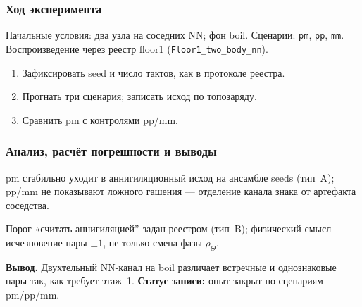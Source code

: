 \subsubsection*{Ход эксперимента}
Начальные условия: два узла на соседних NN; фон boil.
Сценарии: \texttt{pm}, \texttt{pp}, \texttt{mm}.
Воспроизведение через реестр floor1 (\texttt{Floor1\_two\_body\_nn}).

\begin{enumerate}[label=\textbf{Шаг \arabic*:},leftmargin=*,itemsep=0.35em]
\item Зафиксировать seed и число тактов, как в протоколе реестра.
\item Прогнать три сценария; записать исход по топозаряду.
\item Сравнить pm с контролями pp/mm.
\end{enumerate}

\subsubsection*{Анализ, расчёт погрешности и выводы}
pm стабильно уходит в аннигиляционный исход на ансамбле seeds (тип~A); pp/mm не показывают ложного гашения --- отделение канала знака от артефакта соседства.

Порог «считать аннигиляцией'' задан реестром (тип~B); физический смысл --- исчезновение пары $\pm1$, не только смена фазы $\rho_\Theta$.

\textbf{Вывод.}
Двухтельный NN-канал на boil различает встречные и однознаковые пары так, как требует этаж~1.
\textbf{Статус записи:} опыт закрыт по сценариям pm/pp/mm.
